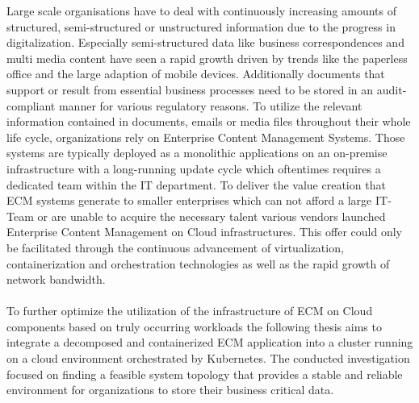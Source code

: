 Large scale organisations have to deal with continuously increasing amounts of structured, semi-structured or unstructured information due to the progress in digitalization.
Especially semi-structured data like business correspondences and multi media content have seen a rapid growth driven by trends like the paperless office and the large adaption of mobile devices.
Additionally documents that support or result from essential business processes need to be stored in an audit-compliant manner for various regulatory reasons.
To utilize the relevant information contained in documents, emails or media files throughout their whole life cycle, organizations rely on Enterprise Content Management Systems.
Those systems are typically deployed as a monolithic applications on an on-premise infrastructure with a long-running update cycle which oftentimes requires a dedicated team within the IT department.
To deliver the value creation that ECM systems generate to smaller enterprises which can not afford a large IT-Team or are unable to acquire the necessary talent various vendors launched Enterprise Content Management on Cloud infrastructures.
This offer could only be facilitated through the continuous advancement of virtualization, containerization and orchestration technologies as well as the rapid growth of network bandwidth.
\\
\\
To further optimize the utilization of the infrastructure of ECM on Cloud components based on truly occurring workloads the following thesis aims to integrate a decomposed and containerized ECM application into a cluster running on a cloud environment orchestrated by Kubernetes.
The conducted investigation focused on finding a feasible system topology that provides a stable and reliable environment for organizations to store their business critical data.